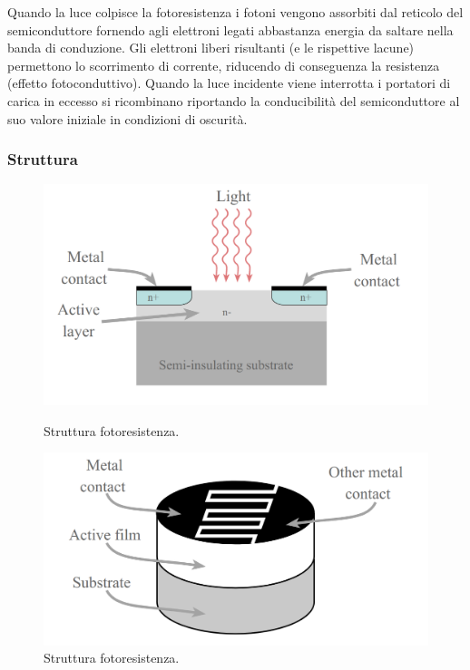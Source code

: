 \documentclass[12pt,oneside,a4paper]{article}
\begin{document}
Quando la luce colpisce la fotoresistenza i fotoni vengono assorbiti dal reticolo del semiconduttore fornendo agli elettroni legati abbastanza energia da saltare nella banda di conduzione. Gli elettroni liberi risultanti (e le rispettive lacune) permettono lo scorrimento di corrente, riducendo di conseguenza la resistenza (effetto fotoconduttivo). Quando la luce incidente viene interrotta i portatori di carica in eccesso si ricombinano riportando la conducibilità del semiconduttore al suo valore iniziale in condizioni di oscurità.


\subsubsection{Struttura}
\begin{figure}[!htb]
    \includegraphics[width=\linewidth]{figures/fotoresistenza-struttura1.png}
    \caption{Struttura fotoresistenza.}
    \endminipage\hfill
    \includegraphics[width=\linewidth]{figures/fotoresistenza-struttura2.png}
    \caption{Struttura fotoresistenza.}
    \endminipage\hfill
\end{figure}
\end{document}
